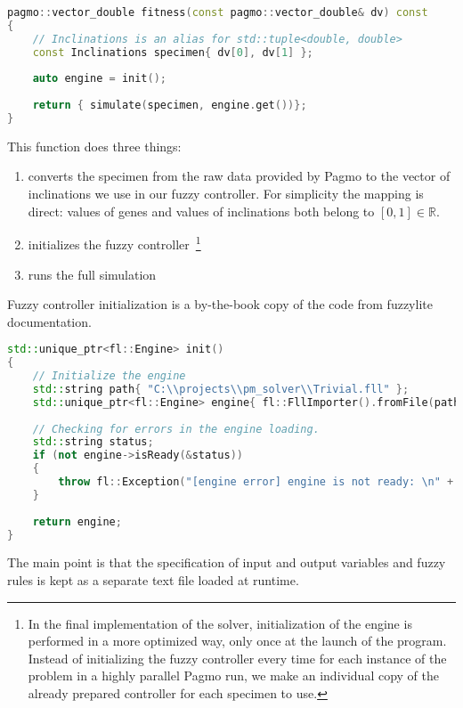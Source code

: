 \documentclass[12pt, a4paper]{report}
\begin{document}
	\begin{lstlisting}[language=c++]
pagmo::vector_double fitness(const pagmo::vector_double& dv) const
{
	// Inclinations is an alias for std::tuple<double, double>
	const Inclinations specimen{ dv[0], dv[1] };
	
	auto engine = init();
	
	return { simulate(specimen, engine.get())};
}
	\end{lstlisting}
	
	This function does three things:
	
	\begin{enumerate}
		\item converts the specimen from the raw data provided by Pagmo to the vector of inclinations we use in our fuzzy controller. For simplicity the mapping is direct: values of genes and values of inclinations both belong to $[0, 1] \in \mathbb{R}$.
		\item initializes the fuzzy controller~\footnote{In the final implementation of the solver, initialization of the engine is performed in a more optimized way, only once at the launch of the program. Instead of initializing the fuzzy controller every time for each instance of the problem in a highly parallel Pagmo run, we make an individual copy of the already prepared controller for each specimen to use.}
		\item runs the full simulation
	\end{enumerate}
	
	Fuzzy controller initialization is a by-the-book copy of the code from fuzzylite documentation.
	
	\begin{lstlisting}[language=c++]
std::unique_ptr<fl::Engine> init()
{
	// Initialize the engine
	std::string path{ "C:\\projects\\pm_solver\\Trivial.fll" };
	std::unique_ptr<fl::Engine> engine{ fl::FllImporter().fromFile(path) };
	
	// Checking for errors in the engine loading.
	std::string status;
	if (not engine->isReady(&status))
	{
		throw fl::Exception("[engine error] engine is not ready: \n" + status);
	}
	
	return engine;
}
	\end{lstlisting}
	
	The main point is that the specification of input and output variables and fuzzy rules is kept as a separate text file loaded at runtime.
	
\end{document}

